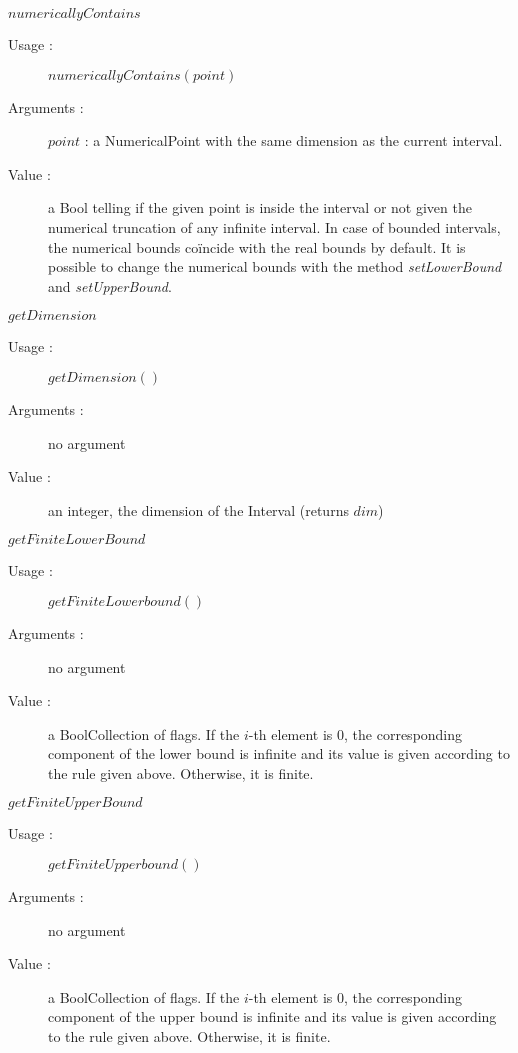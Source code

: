 \begin{description}
\begin{description}
  \item $numericallyContains$
    \begin{description}
    \item[Usage :] $numericallyContains(point)$
    \item[Arguments :] $point$ : a NumericalPoint with the same dimension as the current interval.
    \item[Value :] a Bool telling if the given point is inside the interval or not given the numerical truncation of any infinite interval. In case of bounded intervals, the numerical bounds coïncide with the real bounds by default. It is possible to change the numerical bounds with the method \emph{setLowerBound} and \emph{setUpperBound}.
    \end{description}
    \bigskip
 
  \item $getDimension$
    \begin{description}
    \item[Usage :] $getDimension()$
    \item[Arguments :] no argument
    \item[Value :]  an integer, the dimension of the Interval (returns $dim$)
    \end{description}
    \bigskip

  \item $getFiniteLowerBound$
    \begin{description}
    \item[Usage :] $getFiniteLowerbound()$
    \item[Arguments :] no argument
    \item[Value :] a BoolCollection of flags. If the $i$-th element is 0, the corresponding component of the lower bound is infinite and its value is given according to the rule given above. Otherwise, it is finite.
    \end{description}
    \bigskip

  \item $getFiniteUpperBound$
    \begin{description}
    \item[Usage :] $getFiniteUpperbound()$
    \item[Arguments :] no argument
    \item[Value :] a BoolCollection of flags. If the $i$-th element is 0, the corresponding component of the upper bound is infinite and its value is given according to the rule given above. Otherwise, it is finite.
    \end{description}
    \bigskip


\end{description}
\end{description}
